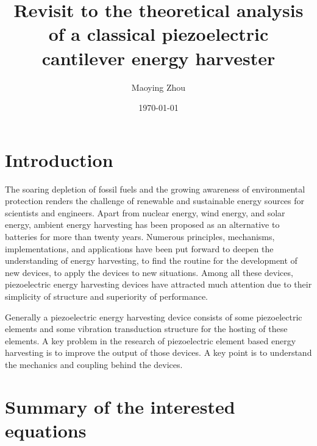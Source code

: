 \documentclass{article}
\title{Revisit to the theoretical analysis of a classical piezoelectric cantilever energy harvester}
\author{Maoying Zhou}
\date{\today}
\begin{document}
\maketitle


\section{Introduction}

The soaring depletion of fossil fuels and the growing awareness of environmental protection renders the challenge of renewable and sustainable energy sources for scientists and engineers. Apart from nuclear energy, wind energy, and solar energy, ambient energy harvesting has been proposed as an alternative to batteries for more than twenty years. Numerous principles, mechanisms, implementations, and applications have been put forward to deepen the understanding of energy harvesting, to find the routine for the development of new devices, to apply the devices to new situations. Among all these devices, piezoelectric energy harvesting devices have attracted much attention due to their simplicity of structure and superiority of performance. 

Generally a piezoelectric energy harvesting device consists of some piezoelectric elements and some vibration transduction structure for the hosting of these elements. A key problem in the research of piezoelectric element based energy harvesting is to improve the output of those devices. A key point is to understand the mechanics and coupling behind the devices.



\section{Summary of the interested equations}
\end{document}
